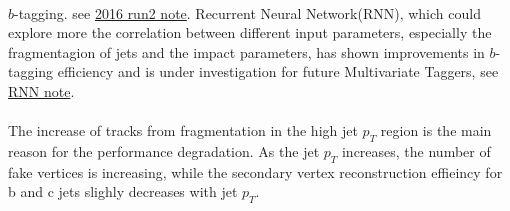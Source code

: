 \paragraph{}
$b$-tagging. see \href{https://cds.cern.ch/record/2160731/files/ATL-PHYS-PUB-2016-012.pdf}{2016 run2 note}. Recurrent Neural Network(RNN), which could explore more the correlation between different input parameters, especially the fragmentagion of jets and the impact parameters, has shown improvements in $b$-tagging efficiency and is under investigation for future Multivariate Taggers, see \href{https://cds.cern.ch/record/2253371}{RNN note}.

\paragraph{}
The increase of tracks from fragmentation in the high jet $p_T$ region is the main reason for the performance
degradation. As the jet $p_T$ increases, the number of fake vertices is increasing, while the secondary vertex reconstruction effieincy for b and c jets slighly decreases with jet $p_T$.

